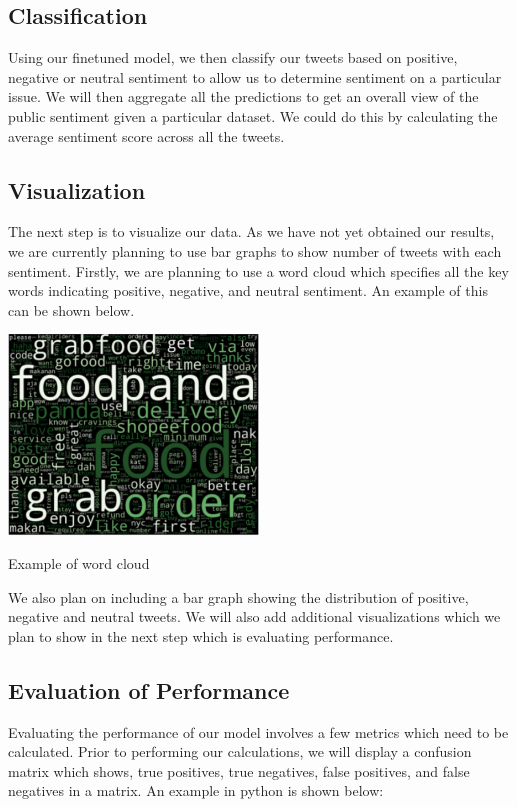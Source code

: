 \documentclass[conference]{IEEEtran}
\begin{document}
\subsection{Classification}
Using our finetuned model, we then classify our tweets based on positive, negative or neutral sentiment to allow us to determine sentiment on a particular issue.  We will then aggregate all the predictions to get an overall view of the public sentiment given a particular dataset. We could do this by calculating the average sentiment score across all the tweets. 

\subsection{Visualization}
The next step is to visualize our data. As we have not yet obtained our results, we are currently planning to use bar graphs to show number of tweets with each sentiment. Firstly, we are planning to use a word cloud which specifies all the key words indicating positive, negative, and neutral sentiment. An example of this can be shown below.




    \begin{centering}
    \includegraphics[width=0.5\textwidth]{wordcloud.png}
    \caption{Example of word cloud}\cite{b2}


\end{centering}


 We also plan on including a bar graph showing the distribution of positive, negative and neutral tweets. We will also add additional visualizations which we plan to show in the next step which is evaluating performance. 



\subsection{Evaluation of Performance}
Evaluating the performance of our model involves a few metrics which need to be calculated. Prior to performing our calculations, we will display a confusion matrix which shows, true positives, true negatives, false positives, and false negatives in a matrix. An example in python is shown below:
\end{document}
